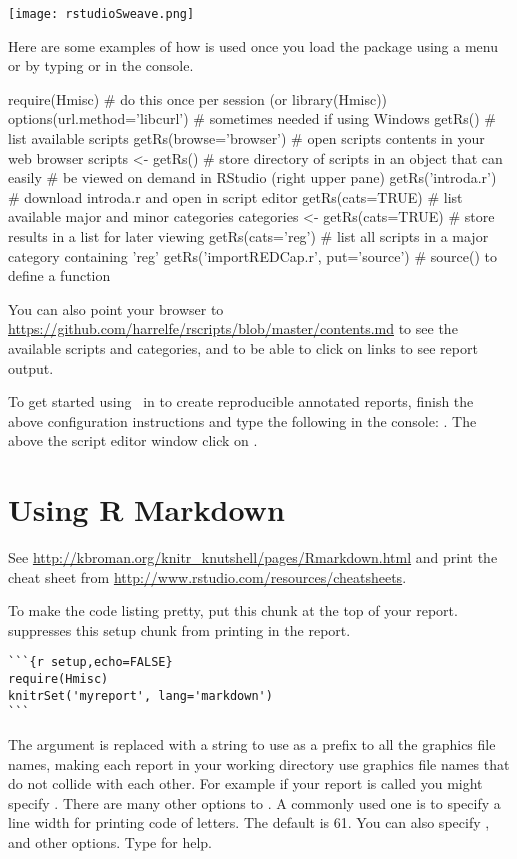 \centerline{\texttt{[image: rstudioSweave.png]}}
\ee
Here are some examples of how  is used once you
load the  package using a menu or by typing
 or  in the console.
\begin{Schunk}
\begin{Sinput}
require(Hmisc)      # do this once per session (or library(Hmisc))
options(url.method='libcurl')    # sometimes needed if using Windows
getRs()             # list available scripts
getRs(browse='browser')  # open scripts contents in your web browser
scripts <- getRs()  # store directory of scripts in an object that can easily
                    # be viewed on demand in RStudio (right upper pane)
getRs('introda.r')  # download introda.r and open in script editor
getRs(cats=TRUE)    # list available major and minor categories
categories <- getRs(cats=TRUE)  # store results in a list for later viewing
getRs(cats='reg')   # list all scripts in a major category containing 'reg'
getRs('importREDCap.r', put='source')   # source() to define a function
\end{Sinput}
\end{Schunk}
You can also point your browser to
\url{https://github.com/harrelfe/rscripts/blob/master/contents.md} to
see the available scripts and categories, and to be able to click on
links to see  report output.

To get started using \R\ in  to create reproducible
annotated reports, finish the above configuration instructions and
type the following in the  console:
.  The above the script editor window
click on .

\section{Using R Markdown}
See \url{http://kbroman.org/knitr_knutshell/pages/Rmarkdown.html} and
print the  cheat sheet from
\url{http://www.rstudio.com/resources/cheatsheets}.

To make the code listing pretty, put this chunk at the top of your
report.   suppresses this setup chunk from printing in
the report.
\begin{verbatim}
```{r setup,echo=FALSE}
require(Hmisc)
knitrSet('myreport', lang='markdown')
```
\end{verbatim}
The argument  is replaced with a string to use as a
prefix to all the graphics file names, making each report in your
working directory use graphics file names that do not collide with
each other.  For example if your report is called
 you might specify
.  There are
many other options to .  A commonly used one is
 to specify a line width for printing code of  letters.  The
default is 61.  You can also specify , and other
options.  Type  for help.

